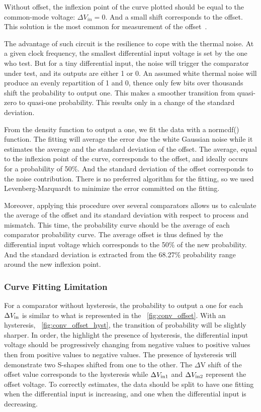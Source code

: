 Without offset, the inflexion point of the curve plotted should be equal to the common-mode voltage: $\Delta V_{in} = 0$. And a small shift corresponds to the offset. This solution is the most common for measurement of the offset~\cite{4395036,6482245,6644886}.

The advantage of such circuit is the resilience to cope with the thermal noise. At a given clock frequency, the smallest differential input voltage is set by the one who test. But for a tiny differential input, the noise will trigger the comparator under test, and its outputs are either 1 or 0. An assumed white thermal noise will produce an evenly repartition of 1 and 0, thence only few bits over thousands shift the probability to output one. This makes a smoother transition from quasi-zero to quasi-one probability. This results only in a change of the standard deviation.

From the density function to output a one, we fit the data with a normcdf() function. The fitting will average the error due the white Gaussian noise while it estimates the average and the standard deviation of the offset. The average, equal to the inflexion point of the curve, corresponds to the offset, and ideally occurs for a probability of 50\%. And the standard deviation of the offset corresponds to the noise contribution. There is no preferred algorithm for the fitting, so we used Levenberg-Marquardt to minimize the error committed on the fitting.

Moreover, applying this procedure over several comparators allows us to calculate the average of the offset and its standard deviation with respect to process and mismatch. This time, the probability curve should be the average of each comparator probability curve. The average offset is thus defined by the differential input voltage which corresponds to the 50\% of the new probability. And the standard deviation is extracted from the 68.27\% probability range around the new inflexion point.

\subsubsection{Curve Fitting Limitation}
For a comparator without hysteresis, the probability to output a one for each $\Delta V_{\rm in}$ is similar to what is represented in the \figurename~\ref{fig:conv_offset}. With an hysteresis, \figurename~\ref{fig:conv_offset_hyst}, the transition of probability will be slightly sharper. In order, the highlight the presence of hysteresis, the differential input voltage should be progressively changing from negative values to positive values then from positive values to negative values. The presence of hysteresis will demonstrate two S-shapes shifted from one to the other. The $\Delta$V shift of the offset value corresponds to the hysteresis while $\Delta V_{\rm in1}$ and $\Delta V_{\rm in2}$ represent the offset voltage. To correctly estimates, the data should be split to have one fitting when the differential input is increasing, and one when the differential input is decreasing.

